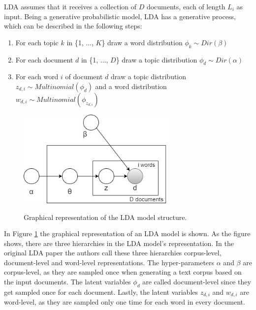             LDA assumes that it receives a collection of $D$ documents, each of length $L_i$ as input. Being a generative probabilistic model, LDA has a generative process, which can be described in the following steps:
            
            \begin{enumerate}
                \item For each topic $k$ in \{1, ..., $K$\} draw a word distribution $\phi_k \sim Dir(\beta)$
                \item For each document $d$ in \{1, ..., $D$\} draw a topic distribution $\phi_d \sim Dir(\alpha)$
                \item For each word $i$ of document $d$ draw a topic distribution $z_{d,i} \sim Multinomial(\phi_d)$ and a word distribution $w_{d,i} \sim Multinomial(\phi_{z_{d,i}})$
            \end{enumerate}
            
            \begin{figure}[!ht]
              \centering
              \includegraphics[width=0.7\textwidth]{figures/LDA_graphical.jpg}\\
              \caption{Graphical representation of the LDA model structure.}
              \label{fig:LDA_graph}
            \end{figure}
            
            In Figure \ref{fig:LDA_graph} the graphical representation of an LDA model is shown. As the figure shows, there are three hierarchies in the LDA model's representation. In the original LDA paper \cite{blei2003latent} the authors call these three hierarchies corpus-level, document-level and word-level representations. The hyper-parameters $\alpha$ and $\beta$ are corpus-level, as they are sampled once when generating a text corpus based on the input documents. The latent variables $\phi_d$ are called document-level since they get sampled once for each document. Lastly, the latent variables $z_{d,i}$ and $w_{d,i}$ are word-level, as they are sampled only one time for each word in every document.
            
